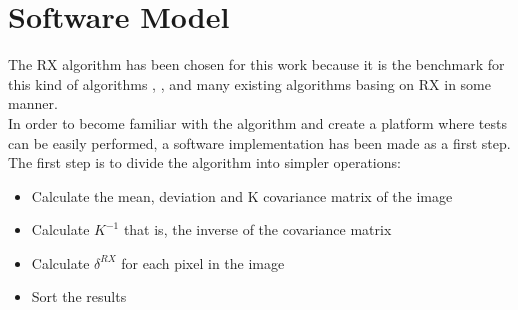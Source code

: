 \cleardoublepage
\chapter{Software Model}
The RX algorithm has been chosen for this work because it is the benchmark for this kind of algorithms \cite{borghys_hyperspectral_2012}, \cite{rosario_semiparametric_2012}, \cite{matteoli_tutorial_2010} and many existing algorithms basing on RX in some manner.
\\
In order to become familiar with the algorithm and create a platform where tests can be easily performed, a software implementation has been made as a first step.
\\
The first step is to divide the algorithm into simpler operations:
\begin{itemize}
\item Calculate the mean, deviation and K covariance matrix of the image
\item Calculate $K^{-1}$ that is, the inverse of the covariance matrix
\item Calculate $\delta ^{RX}$ for each pixel in the image
\item Sort the results
\end{itemize}
\pagebreak
